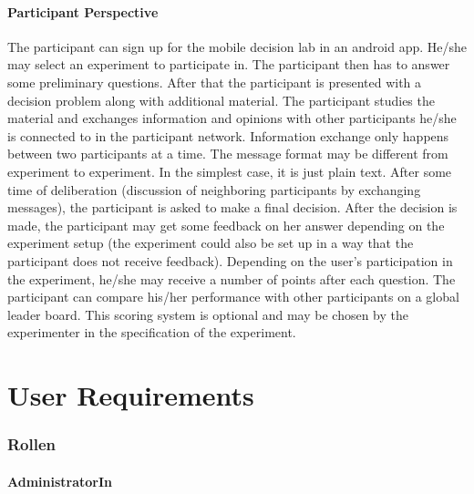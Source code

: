 \documentclass[a4paper, 10pt]{scrreprt}
\begin{document}
\subsection{Participant Perspective}
The participant can sign up for the mobile decision lab in an android app. He/she may select an experiment to participate in. The participant then has to answer some preliminary questions. After that the participant is presented with a decision problem along with additional material. The participant studies the material and exchanges information and opinions with other participants he/she is connected to in the participant network. Information exchange only happens between two participants at a time. The message format may be different from experiment to experiment. In the simplest case, it is just plain text. After some time of deliberation (discussion of neighboring participants by exchanging messages), the participant is asked to make a final decision. After the decision is made, the participant may get some feedback on her answer depending on the experiment setup (the experiment could also be set up in a way that the participant does not receive feedback). Depending on the user's participation in the experiment, he/she may receive a number of points after each question. The participant can compare his/her performance with other participants on a global leader board. This scoring system is optional and may be chosen by the experimenter in the specification of the experiment.




\printnoidxglossary[sort=word]




\part{User Requirements}


\section{Rollen}

\subsection{AdministratorIn}
\end{document}
